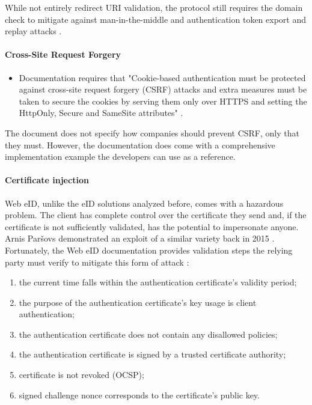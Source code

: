 While not entirely redirect URI validation, the protocol still requires the domain check to mitigate against man-in-the-middle and authentication token export and replay attacks \cite{ria-webeid-systemarchitecture}.

\paragraph{Cross-Site Request Forgery}

\begin{itemize}
  \item Documentation requires that "Cookie-based authentication must be protected against cross-site request forgery (CSRF) attacks and extra measures must be taken to secure the cookies by serving them only over HTTPS and setting the HttpOnly, Secure and SameSite attributes" \cite{ria-webeid-source-web-eid-authtoken-validation-java-readme}.
\end{itemize}

The document does not specify how companies should prevent CSRF, only that they must. However, the documentation does come with a comprehensive implementation example the developers can use as a reference.

\paragraph{Certificate injection}

Web eID, unlike the eID solutions analyzed before, comes with a hazardous problem. The client has complete control over the certificate they send and, if the certificate is not sufficiently validated, has the potential to impersonate anyone. Arnis Paršovs demonstrated an exploit of a similar variety back in 2015 \cite{seb-auth-bypass}. Fortunately, the Web eID documentation provides validation steps the relying party must verify to mitigate this form of attack \cite{ria-webeid-systemarchitecture}:

\begin{enumerate}
  \item the current time falls within the authentication certificate's validity period;
  \item the purpose of the authentication certificate's key usage is client authentication;
  \item the authentication certificate does not contain any disallowed policies;
  \item the authentication certificate is signed by a trusted certificate authority;
  \item certificate is not revoked (OCSP);
  \item signed challenge nonce corresponds to the certificate's public key.
\end{enumerate}

